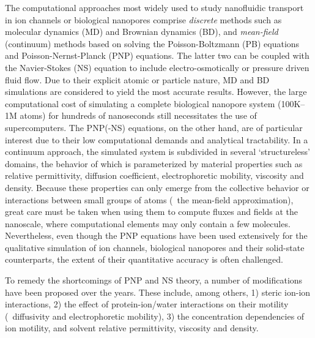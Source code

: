 \documentclass[journal=ancac3,manuscript=article,etalmode=truncate,maxauthors=0,layout=onecolumn]{achemso}
\begin{document}
The computational approaches most widely used to study nanofluidic transport in ion channels or biological
nanopores comprise \emph{discrete} methods such as molecular dynamics
(MD)\cite{Lynden-Bell-1996,Allen-1999,Aksimentiev-2005,Luan-2008,Bhattacharya-2011,Zhang-2014,DiMarino-2015,Belkin-2016}
and Brownian dynamics
(BD),\cite{Schirmer-1999,Im-2002,Noskov-2004,Millar-2008,Egwolf-2010,DeBiase-2015,Pederson-2015} and
\emph{mean-field} (continuum) methods based on solving the Poisson-Boltzmann (PB)
equations\cite{Grochowski-2008, Baldessari-2008-1} and Poisson-Nernst-Planck (PNP)
equations.\cite{Eisenberg-1996,Gillespie-2002, Simakov-2010} The latter two can be coupled with the
Navier-Stokes (NS) equation to include electro-osmotically or pressure driven fluid
flow.\cite{Lu-2012,Pederson-2015} Due to their explicit atomic or particle nature, MD and BD simulations are
considered to yield the most accurate results. However, the large computational cost of simulating a complete
biological nanopore system (100K--1M atoms) for hundreds of nanoseconds still necessitates the use of
supercomputers.\cite{Aksimentiev-2005,Bhattacharya-2011} The PNP(-NS) equations, on the other hand, are of
particular interest due to their low computational demands and analytical tractability. In a continuum
approach, the simulated system is subdivided in several `structureless' domains, the behavior of which is
parameterized by material properties such as relative permittivity, diffusion coefficient, electrophoretic
mobility, viscosity and density. Because these properties can only emerge from the collective behavior or
interactions between small groups of atoms (\ie~the mean-field approximation), great care must be taken when
using them to compute fluxes and fields at the nanoscale, where computational elements may only contain a few
molecules.\cite{Corry-2000,Collins-2012} Nevertheless, even though the PNP equations have been used extensively for the
qualitative simulation of ion channels,\cite{Im-2002,Furini-2006,Liu-2015} biological
nanopores\cite{Simakov-2010,Pederson-2015,Aguilella-Arzo-2017,Simakov-2018} and their solid-state
counterparts,\cite{Cervera-2005,White-2008,Chaudhry-2014,Laohakunakorn-2015} the extent of their quantitative accuracy is often challenged.\cite{Corry-2000,Collins-2012,Maffeo-2012,Thomas-2014,Kim-2015}

To remedy the shortcomings of PNP and NS theory, a number of modifications have been proposed over the years.
These include, among others, 1) steric ion-ion interactions, 2) the effect of protein-ion/water interactions
on their motility (\ie~diffusivity and electrophoretic mobility), 3) the concentration dependencies of ion
motility, and solvent relative permittivity, viscosity and density.
\end{document}
